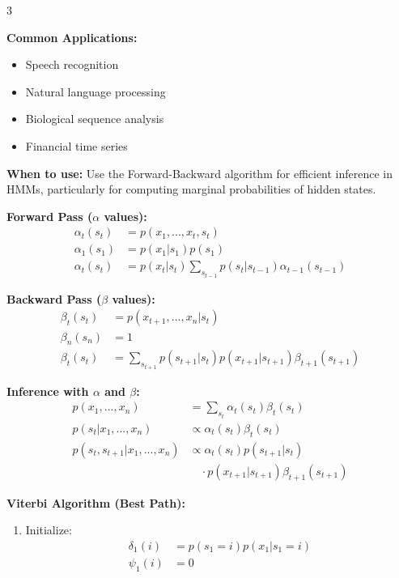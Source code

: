 \documentclass[10pt,landscape]{article}
\begin{document}
\begin{multicols}{3}
\begin{tcolorbox}[breakable, title=9. Hidden Markov Models Concepts, colback=hmm,boxsep=1pt,left=1pt,right=1pt,top=1pt,bottom=1pt]
\textbf{Common Applications:}
\begin{itemize}[leftmargin=*,noitemsep,topsep=0pt]
    \item Speech recognition
    \item Natural language processing
    \item Biological sequence analysis
    \item Financial time series
\end{itemize}
\end{tcolorbox}

\begin{tcolorbox}[breakable, title=9.1 Forward-Backward Algorithm for HMMs, colback=hmm,boxsep=1pt,left=1pt,right=1pt,top=1pt,bottom=1pt]
\textbf{When to use:} Use the Forward-Backward algorithm for efficient inference in HMMs, particularly for computing marginal probabilities of hidden states.

\textbf{Forward Pass ($\alpha$ values):}
\begin{align}
\alpha_t(s_t) &= p(x_1, ..., x_t, s_t)\\
\alpha_1(s_1) &= p(x_1|s_1)p(s_1)\\
\alpha_t(s_t) &= p(x_t|s_t) \sum_{s_{t-1}} p(s_t|s_{t-1})\alpha_{t-1}(s_{t-1})
\end{align}

\textbf{Backward Pass ($\beta$ values):}
\begin{align}
\beta_t(s_t) &= p(x_{t+1}, ..., x_n|s_t)\\
\beta_n(s_n) &= 1\\
\beta_t(s_t) &= \sum_{s_{t+1}} p(s_{t+1}|s_t)p(x_{t+1}|s_{t+1})\beta_{t+1}(s_{t+1})
\end{align}

\textbf{Inference with $\alpha$ and $\beta$:}
\begin{align}
p(x_1, ..., x_n) &= \sum_{s_t} \alpha_t(s_t)\beta_t(s_t)\\
p(s_t|x_1, ..., x_n) &\propto \alpha_t(s_t)\beta_t(s_t)\\
p(s_t, s_{t+1}|x_1, ..., x_n) &\propto \alpha_t(s_t)p(s_{t+1}|s_t)\\
&\quad\cdot p(x_{t+1}|s_{t+1})\beta_{t+1}(s_{t+1})
\end{align}

\textbf{Viterbi Algorithm (Best Path):}
\begin{enumerate}[leftmargin=*,noitemsep,topsep=0pt]
    \item Initialize:
    \begin{align}
    \delta_1(i) &= p(s_1 = i)p(x_1|s_1 = i)\\
    \psi_1(i) &= 0
    \end{align}
    

\end{enumerate}
\end{tcolorbox}
\end{multicols}
\end{document}
